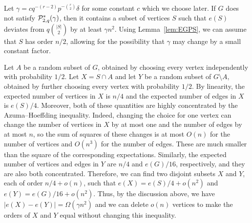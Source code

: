 \documentclass[11pt]{article}
\begin{document}
Let $\gamma =c q^{-(r-2)} p^{-{r \choose 2}} \delta$ for some constant $c$ which we choose later. If $G$ does not satisfy ${\cal P}^*_{2,q}(\gamma)$, then it contains a subset of vertices $S$ such that $e(S)$ deviates from $q{|S| \choose 2}$ by at least $\gamma n^2$. Using Lemma~\ref{lem:EGPS}, we can assume that $S$ has order $n/2$, allowing for the possibility that $\gamma$ may change by a small constant factor. 

Let $A$ be a random subset of $G$, obtained by choosing every vertex independently with probability $1/2$. Let $X=S \cap A$ and let $Y$ be a random subset of $G \setminus A$, obtained by further choosing every vertex with probability $1/2$. By linearity, the expected number of vertices in $X$ is $n/4$
and the expected number of edges in $X$ is $e(S)/4$. Moreover, both of these quantities are highly concentrated by the
Azuma--Hoeffding inequality. Indeed, changing the choice for one vertex can change the number of vertices in $X$ by at most one and the number of edges by at most $n$, so the sum of squares of these changes is at most $O(n)$ for the number of vertices and $O(n^3)$ for the number of edges.
These are much smaller than the square of the corresponding expectations.
Similarly, the expected number of vertices and edges in $Y$ are $n/4$ and 
$e(G)/16$, respectively, and they are also both concentrated. Therefore, we can find two disjoint subsets $X$ and $Y$, each of order
$n/4+o(n)$, such that $e(X)=e(S)/4+o(n^2)$ and $e(Y)=e(G)/16+o(n^2)$. Thus, by the discussion above, we have $\big| e(X)-e(Y)\big| = \Omega(\gamma n^2)$ and we can delete $o(n)$ vertices to make the orders of $X$ and $Y$ equal without changing this inequality. 
 
\end{document}
